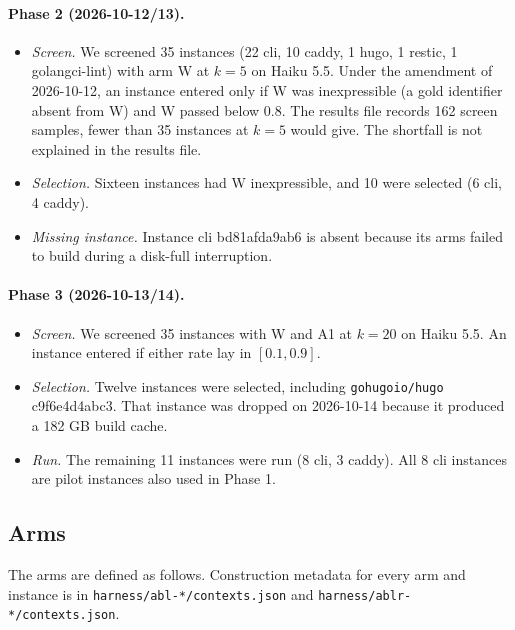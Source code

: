 \paragraph{Phase 2 (2026-10-12/13).}
\begin{itemize}
\item \emph{Screen.} We screened 35 instances (22 cli, 10 caddy, 1 hugo, 1 restic, 1 golangci-lint) with arm W at $k=5$ on Haiku 5.5. Under the amendment of 2026-10-12, an instance entered only if W was inexpressible (a gold identifier absent from W) and W passed below 0.8. The results file records 162 screen samples, fewer than 35 instances at $k=5$ would give. The shortfall is not explained in the results file.
\item \emph{Selection.} Sixteen instances had W inexpressible, and 10 were selected (6 cli, 4 caddy).
\item \emph{Missing instance.} Instance cli bd81afda9ab6 is absent because its arms failed to build during a disk-full interruption.
\end{itemize}

\paragraph{Phase 3 (2026-10-13/14).}
\begin{itemize}
\item \emph{Screen.} We screened 35 instances with W and A1 at $k=20$ on Haiku 5.5. An instance entered if either rate lay in $[0.1, 0.9]$.
\item \emph{Selection.} Twelve instances were selected, including \texttt{gohugoio/hugo} c9f6e4d4abc3. That instance was dropped on 2026-10-14 because it produced a 182 GB build cache.
\item \emph{Run.} The remaining 11 instances were run (8 cli, 3 caddy). All 8 cli instances are pilot instances also used in Phase 1.
\end{itemize}

\subsection{Arms}\label{sec:arms}

The arms are defined as follows. Construction metadata for every arm and instance is in \texttt{harness/abl-*/contexts.json} and \texttt{harness/ablr-*/contexts.json}.

